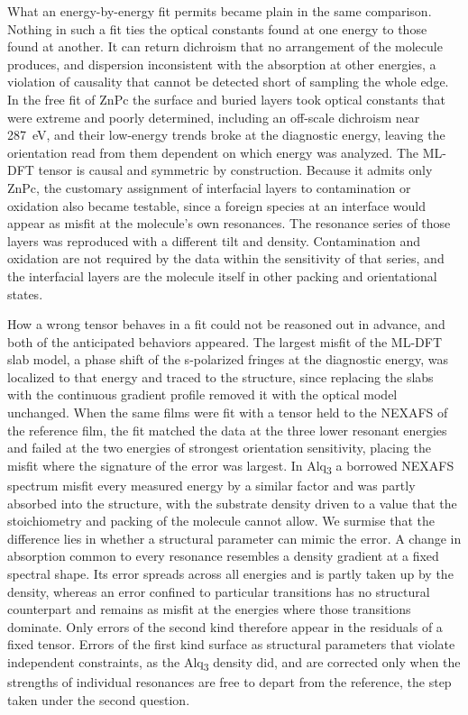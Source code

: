 What an energy-by-energy fit permits became plain in the same comparison. Nothing in such a fit ties the optical constants found at one energy to those found at another. It can return dichroism that no arrangement of the molecule produces, and dispersion inconsistent with the absorption at other energies, a violation of causality that cannot be detected short of sampling the whole edge. In the free fit of ZnPc the surface and buried layers took optical constants that were extreme and poorly determined, including an off-scale dichroism near \qty{287}{eV}, and their low-energy trends broke at the diagnostic energy, leaving the orientation read from them dependent on which energy was analyzed. The ML-DFT tensor is causal and symmetric by construction. Because it admits only ZnPc, the customary assignment of interfacial layers to contamination or oxidation also became testable, since a foreign species at an interface would appear as misfit at the molecule's own resonances. The resonance series of those layers was reproduced with a different tilt and density. Contamination and oxidation are not required by the data within the sensitivity of that series, and the interfacial layers are the molecule itself in other packing and orientational states.

How a wrong tensor behaves in a fit could not be reasoned out in advance, and both of the anticipated behaviors appeared. The largest misfit of the ML-DFT slab model, a phase shift of the s-polarized fringes at the diagnostic energy, was localized to that energy and traced to the structure, since replacing the slabs with the continuous gradient profile removed it with the optical model unchanged. When the same films were fit with a tensor held to the NEXAFS of the reference film, the fit matched the data at the three lower resonant energies and failed at the two energies of strongest orientation sensitivity, placing the misfit where the signature of the error was largest. In Alq\textsubscript{3} a borrowed NEXAFS spectrum misfit every measured energy by a similar factor and was partly absorbed into the structure, with the substrate density driven to a value that the stoichiometry and packing of the molecule cannot allow. We surmise that the difference lies in whether a structural parameter can mimic the error. A change in absorption common to every resonance resembles a density gradient at a fixed spectral shape. Its error spreads across all energies and is partly taken up by the density, whereas an error confined to particular transitions has no structural counterpart and remains as misfit at the energies where those transitions dominate. Only errors of the second kind therefore appear in the residuals of a fixed tensor. Errors of the first kind surface as structural parameters that violate independent constraints, as the Alq\textsubscript{3} density did, and are corrected only when the strengths of individual resonances are free to depart from the reference, the step taken under the second question.


